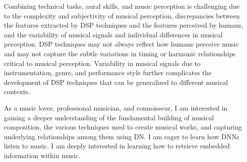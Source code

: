 Combining technical tasks, aural skills, and music perception is challenging due to the complexity and subjectivity of musical perception, discrepancies between the features extracted by DSP techniques and the features perceived by humans, and the variability of musical signals and individual differences in musical perception. DSP techniques may not always reflect how humans perceive music and may not capture the subtle variations in timing or harmonic relationships critical to musical perception. Variability in musical signals due to instrumentation, genre, and performance style further complicates the development of DSP techniques that can be generalized to different musical contexts.

As a music lover, professional musician, and connoisseur, I am interested in gaining a deeper understanding of the fundamental building of musical composition, the various techniques used to create musical works, and capturing underlying relationships among them using DN.  I am eager to learn how DNNs listen to music. I am deeply interested in learning how to retrieve embedded information within music. 